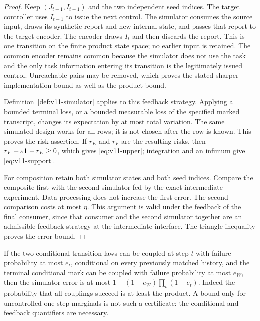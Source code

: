 \begin{proof}
Keep $(J_{t-1},I_{t-1})$ and the two independent seed indices. The target
controller uses $I_{t-1}$ to issue the next control. The simulator consumes
the source input, draws its synthetic report and new internal state, and
passes that report to the target encoder. The encoder draws $I_t$ and
then discards the report. This is one transition on the finite product
state space; no earlier input is retained. The common encoder remains
common because the simulator does not use the task and the only task
information entering its transition is the legitimately issued control.
Unreachable pairs may be removed, which proves the stated sharper
implementation bound as well as the product bound.

Definition~\ref{def:v11-simulator} applies to this feedback strategy.
Applying a bounded terminal loss, or a bounded measurable loss of the
specified marked transcript, changes its expectation by at most total
variation. The same simulated design works for all rows; it is not chosen
after the row is known. This proves the risk assertion. If $r_E$ and $r_F$
are the resulting risks, then $r_F+\varepsilon\mathbf 1-r_E\ge0$, which gives
\eqref{eq:v11-upper}; integration and an infimum give
\eqref{eq:v11-support}.

For composition retain both simulator states and both seed indices.
Compare the composite first with the second simulator fed by the exact
intermediate experiment. Data processing does not increase the first
error. The second comparison costs at most $\eta$. This argument is valid
under the feedback of the final consumer, since that consumer and the
second simulator together are an admissible feedback strategy at the
intermediate interface. The triangle inequality proves the error bound.
\end{proof}

\begin{remark}
\label{rem:v11-local}
If the two conditional transition laws can be coupled at step $t$ with
failure probability at most $e_t$, conditional on every previously matched
history, and the terminal conditional mark can be coupled with failure
probability at most $e_W$, then the simulator error is at most
$1-(1-e_W)\prod_t(1-e_t)$. Indeed the probability that all couplings succeed
is at least the product. A bound only for uncontrolled one-step marginals
is not such a certificate: the conditional and feedback quantifiers are
necessary.
\end{remark}

